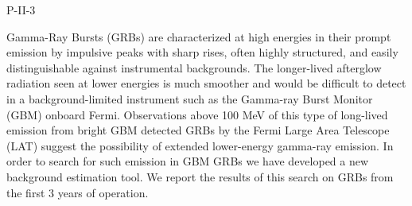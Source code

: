 P-II-3


\bigskip



\bigskip

\noindent Gamma-Ray Bursts (GRBs) are characterized at high energies in their prompt emission by impulsive peaks with sharp rises, often highly structured, and easily distinguishable against instrumental backgrounds. The longer-lived afterglow radiation seen at lower energies is much smoother and would be difficult to detect in a background-limited instrument such as the Gamma-ray Burst Monitor (GBM) onboard Fermi. Observations above 100 MeV of this type of long-lived emission from bright GBM detected GRBs by the Fermi Large Area Telescope (LAT) suggest the possibility of extended lower-energy gamma-ray emission. In order to search for such emission in GBM GRBs we have developed a new background estimation tool. We report the results of this search on GRBs from the first 3 years of operation.

